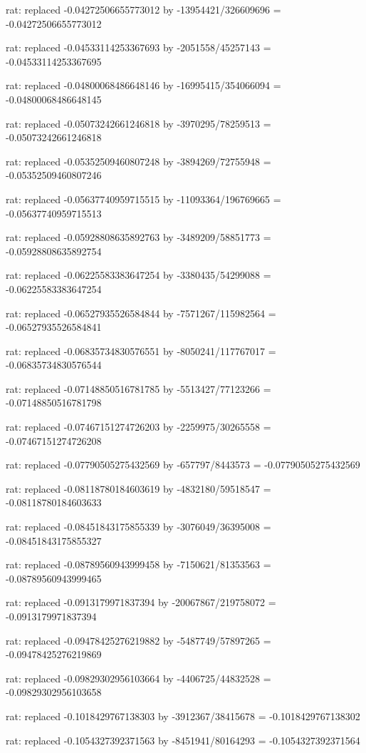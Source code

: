 \documentclass[a4paper,10pt]{article}
\begin{document}
\begin{eulernotebook}
\begin{eulercomment}
\begin{eulercomment}
\begin{eulercomment}
\begin{eulercomment}
\begin{eulercomment}
\begin{eulercomment}
\begin{eulercomment}
\begin{eulercomment}
\begin{eulercomment}
\begin{eulercomment}
\begin{eulercomment}
\begin{eulercomment}
\begin{eulercomment}
\begin{eulercomment}
\begin{eulercomment}
\begin{eulercomment}
\begin{euleroutput}
  rat: replaced -0.04272506655773012 by -13954421/326609696 = -0.04272506655773012
  
  rat: replaced -0.04533114253367693 by -2051558/45257143 = -0.04533114253367695
  
  rat: replaced -0.04800068486648146 by -16995415/354066094 = -0.04800068486648145
  
  rat: replaced -0.05073242661246818 by -3970295/78259513 = -0.05073242661246818
  
  rat: replaced -0.05352509460807248 by -3894269/72755948 = -0.05352509460807246
  
  rat: replaced -0.05637740959715515 by -11093364/196769665 = -0.05637740959715513
  
  rat: replaced -0.05928808635892763 by -3489209/58851773 = -0.05928808635892754
  
  rat: replaced -0.06225583383647254 by -3380435/54299088 = -0.06225583383647254
  
  rat: replaced -0.06527935526584844 by -7571267/115982564 = -0.06527935526584841
  
  rat: replaced -0.06835734830576551 by -8050241/117767017 = -0.06835734830576544
  
  rat: replaced -0.07148850516781785 by -5513427/77123266 = -0.07148850516781798
  
  rat: replaced -0.07467151274726203 by -2259975/30265558 = -0.07467151274726208
  
  rat: replaced -0.07790505275432569 by -657797/8443573 = -0.07790505275432569
  
  rat: replaced -0.08118780184603619 by -4832180/59518547 = -0.08118780184603633
  
  rat: replaced -0.08451843175855339 by -3076049/36395008 = -0.08451843175855327
  
  rat: replaced -0.08789560943999458 by -7150621/81353563 = -0.08789560943999465
  
  rat: replaced -0.0913179971837394 by -20067867/219758072 = -0.0913179971837394
  
  rat: replaced -0.09478425276219882 by -5487749/57897265 = -0.09478425276219869
  
  rat: replaced -0.09829302956103664 by -4406725/44832528 = -0.09829302956103658
  
  rat: replaced -0.1018429767138303 by -3912367/38415678 = -0.1018429767138302
  
  rat: replaced -0.1054327392371563 by -8451941/80164293 = -0.1054327392371564
  

\end{euleroutput}
\end{eulercomment}
\end{eulercomment}
\end{eulercomment}
\end{eulercomment}
\end{eulercomment}
\end{eulercomment}
\end{eulercomment}
\end{eulercomment}
\end{eulercomment}
\end{eulercomment}
\end{eulercomment}
\end{eulercomment}
\end{eulercomment}
\end{eulercomment}
\end{eulercomment}
\end{eulercomment}
\end{eulernotebook}
\end{document}
